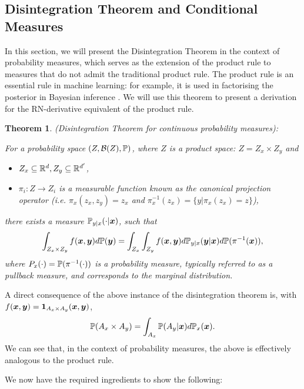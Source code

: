 \documentclass[a4paper,12pt,twoside,openright]{report}
\newtheorem{theorem}{Theorem}
\theoremstyle{definition}
\begin{document}
\subsection{Disintegration Theorem and Conditional Measures}

In this section, we will present the Disintegration Theorem in the context of probability measures, which serves as the extension of the product rule to measures that do not admit the traditional product rule. The product rule is an essential rule in machine learning: for example, it is used in factorising the posterior in Bayesian inference \citep{bayes1763lii}. We will use this theorem to present a derivation for the RN-derivative equivalent of the product rule.

\begin{theorem} (Disintegration Theorem for continuous probability measures): 

For a probability space $(Z, \calB(Z) ,\P)$, where $Z$ is a product space: $Z = Z_x \times Z_y$ and
\begin{itemize}
    \item  $Z_x \subseteq \R^d, Z_y \subseteq \R^{d'}$,
    \item  $\pi_i: Z \rightarrow Z_i$ is a measurable function known as the canonical projection operator (i.e. $\pi_x(z_x,z_y) = z_x$ and $\pi^{-1}_x(z_x) = \{y | \pi_x(z_x) = z\}$),
\end{itemize}
there exists a measure $\P_{y|x}(\cdot | \vx)$, such that
  \begin{align}
      \int_{Z_x \times Z_y} f(\vx, \vy) d\P(\vy) = \int_{Z_x}\int_{Z_y} f(\vx,\vy) d\P_{y|x}(\vy | \vx) d\P(\pi^{-1}(\vx)),
  \end{align}
 where $P_x(\cdot) = \P(\pi^{-1}(\cdot))$ is a probability measure, typically referred to as a pullback measure, and corresponds to the marginal distribution.
\end{theorem}

A direct consequence of the above instance of the disintegration theorem is, with $f(\vx,\vy) = \ind_{A_x \times A_y}(\vx,\vy)$,
\begin{align}
    \P(A_x \times A_y) = \int_{A_x}\P(A_y | \vx) d\P_x(\vx).
\end{align}
 We can see that, in the context of probability measures, the above is effectively analogous to the product rule.

We now have the required ingredients to show the following:
\end{document}

